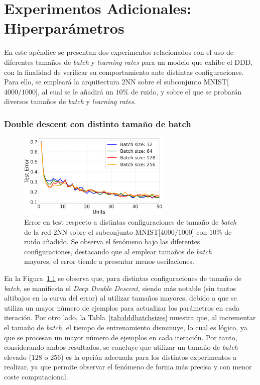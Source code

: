 
\chapter{Experimentos Adicionales: Hiperparámetros}\label{ap:apendiceB}

En este apéndice se presentan dos experimentos relacionados con el uso de diferentes tamaños de \textit{batch} y \textit{learning rates} para un modelo que exhibe el DDD, con la finalidad de verificar su comportamiento ante distintas configuraciones. Para ello, se empleará la arquitectura $2$NN sobre el subconjunto MNIST[$4000/1000$], al cual se le añadirá un $10$\% de ruido, y sobre el que se probarán diversos tamaños de \textit{batch} y \textit{learning rates}.
 
\subsection*{Double descent con distinto tamaño de batch}

\begin{figure}[h!]
    \centering
    \includegraphics[width=0.65\textwidth]{img/experiments/batch_sizes_ddd.png}
    \caption[\textit{Deep Double Descent} para distintos tamaños de \textit{batch}.]{Error en test respecto a distintas configuraciones de tamaño de \textit{batch} de la red $2$NN sobre el subconjunto MNIST[$4000/1000$] con $10$\% de ruido añadido. Se observa el fenómeno bajo las diferentes configuraciones, destacando que al emplear tamaños de \textit{batch} mayores, el error tiende a presentar menos oscilaciones.}\label{fig:dddbatchsizes}
\end{figure}

En la Figura~\ref{fig:dddbatchsizes} se observa que, para distintas configuraciones de tamaño de \textit{batch}, se manifiesta el \textit{Deep Double Descent}, siendo más notable (sin tantos altibajos en la curva del error) al utilizar tamaños mayores, debido a que se utiliza un mayor número de ejemplos para actualizar los parámetros en cada iteración. Por otro lado, la Tabla~\ref{tab:dddbatchsizes} muestra que, al incrementar el tamaño de \textit{batch}, el tiempo de entrenamiento disminuye, lo cual es lógico, ya que se procesan un mayor número de ejemplos en cada iteración. Por tanto, considerando ambos resultados, se concluye que utilizar un tamaño de \textit{batch} elevado ($128$ o $256$) es la opción adecuada para los distintos experimentos a realizar, ya que permite observar el fenómeno de forma más precisa y con menor coste computacional.

